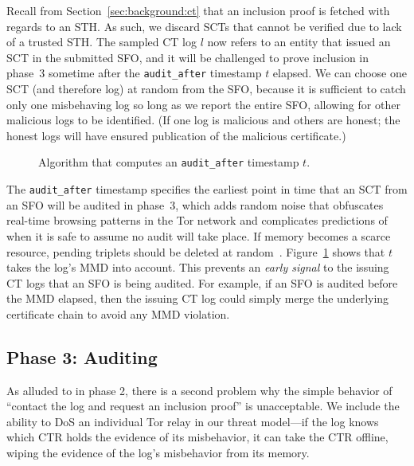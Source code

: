 Recall from Section~\ref{sec:background:ct} that an inclusion proof is fetched
with regards to an STH\@.  As such, we discard SCTs that cannot be verified due
to lack of a trusted STH\@.  The sampled CT log $l$ now refers to an entity that
issued an SCT in the submitted SFO, and it will be challenged to prove inclusion
in phase~3 sometime after the \texttt{audit\_after} timestamp $t$ elapsed. We
can choose one SCT (and therefore log) at random from the SFO, because it is
sufficient to catch only one misbehaving log so long as we report the entire
SFO, allowing for other malicious logs to be identified. (If one log is
malicious and others are honest; the honest logs will have ensured publication
of the malicious certificate.)

\begin{figure}
	\centering
	\caption{%
		Algorithm that computes an \texttt{audit\_after} timestamp $t$.
	}
	\label{fig:audit-after}
\end{figure}

The \texttt{audit\_after} timestamp specifies the earliest point in time that an
SCT from an SFO will be audited in phase~3, which adds random noise that
obfuscates real-time browsing patterns in the Tor network and complicates
predictions of when it is safe to assume no audit will take place.  If memory
becomes a scarce resource, pending triplets should be deleted at
random~\cite{nordberg}. Figure~\ref{fig:audit-after} shows that $t$ takes the
log's MMD into account.  This prevents an \emph{early signal} to the issuing CT
logs that an SFO is being audited.  For example, if an SFO is audited before the
MMD elapsed, then the issuing CT log could simply merge the underlying
certificate chain to avoid any MMD violation.

\subsection{Phase 3: Auditing} \label{sec:base:phase3}

As alluded to in phase 2, there is a second problem why the simple behavior of
``contact the log and request an inclusion proof'' is unacceptable. We include
the ability to DoS an individual Tor relay in our threat model---if the log
knows which CTR holds the evidence of its misbehavior, it can take the CTR
offline, wiping the evidence of the log's misbehavior from its memory. 

